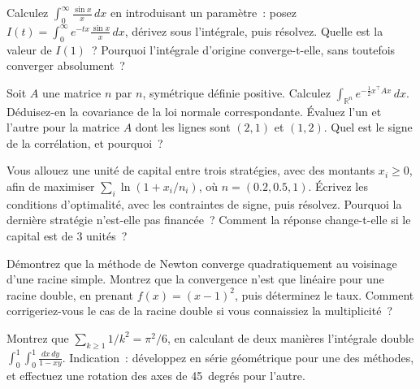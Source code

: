 \begin{question}\label{iq:iv1:calculus-and-optimisation:15}
Calculez $\int_0^\infty \frac{\sin x}{x}\,dx$ en introduisant un paramètre~: posez $I(t) = \int_0^\infty e^{-tx}\frac{\sin x}{x}\,dx$, dérivez sous l'intégrale, puis résolvez. Quelle est la valeur de $I(1)$~? Pourquoi l'intégrale d'origine converge-t-elle, sans toutefois converger absolument~?
\end{question}

\begin{question}\label{iq:iv1:calculus-and-optimisation:16}
Soit $A$ une matrice $n$ par $n$, symétrique définie positive. Calculez $\int_{\mathbb{R}^n} e^{-\frac12 x^\top Ax}\,dx$. Déduisez-en la covariance de la loi normale correspondante. Évaluez l'un et l'autre pour la matrice $A$ dont les lignes sont $(2, 1)$ et $(1, 2)$. Quel est le signe de la corrélation, et pourquoi~?
\end{question}

\begin{question}\label{iq:iv1:calculus-and-optimisation:17}
Vous allouez une unité de capital entre trois stratégies, avec des montants $x_i \ge 0$, afin de maximiser $\sum_i \ln(1 + x_i/n_i)$, où $n = (0.2, 0.5, 1)$. Écrivez les conditions d'optimalité, avec les contraintes de signe, puis résolvez. Pourquoi la dernière stratégie n'est-elle pas financée~? Comment la réponse change-t-elle si le capital est de 3 unités~?
\end{question}

\begin{question}\label{iq:iv1:calculus-and-optimisation:18}
Démontrez que la méthode de Newton converge quadratiquement au voisinage d'une racine simple. Montrez que la convergence n'est que linéaire pour une racine double, en prenant $f(x) = (x - 1)^2$, puis déterminez le taux. Comment corrigeriez-vous le cas de la racine double si vous connaissiez la multiplicité~?
\end{question}

\begin{question}\label{iq:iv1:calculus-and-optimisation:19}
Montrez que $\sum_{k \ge 1} 1/k^2 = \pi^2/6$, en calculant de deux manières l'intégrale double $\int_0^1\int_0^1 \frac{dx\,dy}{1 - xy}$. Indication~: développez en série géométrique pour une des méthodes, et effectuez une rotation des axes de 45~degrés pour l'autre.
\end{question}

